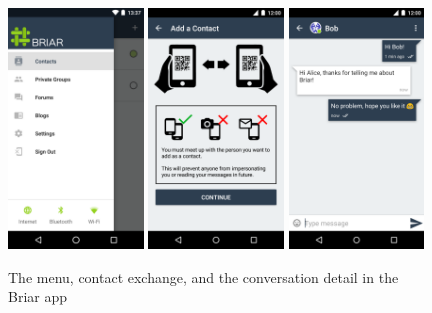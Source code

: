 \begin{figure}
    \centering
    \includegraphics[width=0.32\textwidth]{screens/briar/briar1}
    \includegraphics[width=0.32\textwidth]{screens/briar/contact}
    \includegraphics[width=0.32\textwidth]{screens/briar/briar2}
    \caption{The menu, contact exchange, and the conversation detail in the Briar app}
    \label{manyverse}
\end{figure}


